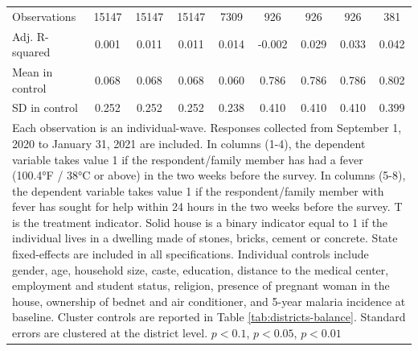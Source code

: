{{\begin{tabular}{l*{8}{c}}
\hline
Observations    &\num{15147}         &\num{15147}         &\num{15147}         &\num{7309}         &\num{926}         &\num{926}         &\num{926}         &\num{381}         \\
Adj. R-squared  &    0.001         &    0.011         &    0.011         &    0.014         &   -0.002         &    0.029         &    0.033         &    0.042         \\
Mean in control &    0.068         &    0.068         &    0.068         &    0.060         &    0.786         &    0.786         &    0.786         &    0.802         \\
SD in control   &    0.252         &    0.252         &    0.252         &    0.238         &    0.410         &    0.410         &    0.410         &    0.399         \\
\hline\hline
\multicolumn{9}{p{1.02\linewidth}}{\scriptsize Each observation is an individual-wave. Responses collected from September 1, 2020 to January 31, 2021 are included. In columns (1-4), the dependent variable takes value 1 if the respondent/family member has had a fever (100.4°F / 38°C or above) in the two weeks before the survey. In columns (5-8), the dependent variable takes value 1 if the respondent/family member with fever has sought for help within 24 hours in the two weeks before the survey. T is the treatment indicator. Solid house is a binary indicator equal to 1 if the individual lives in a dwelling made of stones, bricks, cement or concrete. State fixed-effects are included in all specifications. Individual controls include gender, age, household size, caste, education, distance to the medical center, employment and student status, religion, presence of pregnant woman in the house, ownership of bednet and air conditioner, and 5-year malaria incidence at baseline. Cluster controls are reported in Table \ref{tab:districts-balance}. Standard errors are clustered at the district level. \sym{*} \(p<0.1\), \sym{**} \(p<0.05\), \sym{***} \(p<0.01\)}\\
\end{tabular}
}%

}
